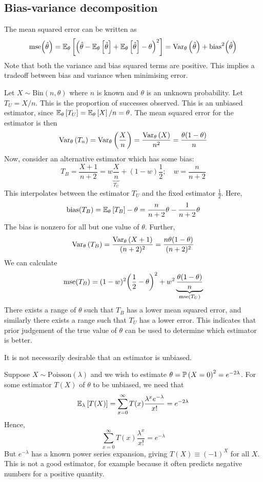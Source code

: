 \subsection{Bias-variance decomposition}
The mean squared error can be written as
\[
	\mathrm{mse}\qty(\hat \theta) = \mathbb{E}_{\theta}\left[{\qty(\hat \theta - \mathbb{E}_{\theta}\left[{\hat\theta}\right] + \mathbb{E}_{\theta}\left[{\hat\theta}\right] - \theta)^2}\right] = \operatorname{Var}_{\theta}\left({\hat \theta}\right) + \mathrm{bias}^2\qty(\hat\theta)
\]
Note that both the variance and bias squared terms are positive.
This implies a tradeoff between bias and variance when minimising error.
\begin{example}
	Let \( X \sim \mathrm{Bin}(n, \theta) \) where \( n \) is known and \( \theta \) is an unknown probability.
	Let \( T_U = X / n \).
	This is the proportion of successes observed.
	This is an unbiased estimator, since \( \mathbb{E}_{\theta}\left[{T_U}\right] = \mathbb{E}_{\theta}\left[{X}\right]/n = \theta \).
	The mean squared error for the estimator is then
	\[
		\operatorname{Var}_{\theta}\left({T_n}\right) = \operatorname{Var}_{\theta}\left({\frac{X}{n}}\right) = \frac{\operatorname{Var}_{\theta}\left({X}\right)}{n^2} = \frac{\theta(1-\theta)}{n}
	\]
	Now, consider an alternative estimator which has some bias:
	\[
		T_B = \frac{X+1}{n+2} = w \underbrace{\frac{X}{n}}_{T_U} + (1-w)\frac{1}{2};\quad w = \frac{n}{n+2}
	\]
	This interpolates between the estimator \( T_U \) and the fixed estimator \( \frac{1}{2} \).
	Here,
	\[
		\mathrm{bias}(T_B) = \mathbb{E}_{\theta}\left[{T_B}\right] - \theta = \frac{n}{n+2}\theta - \frac{1}{n+2}\theta
	\]
	The bias is nonzero for all but one value of \( \theta \).
	Further,
	\[
		\operatorname{Var}_{\theta}\left({T_B}\right) = \frac{\operatorname{Var}_{\theta}\left({X+1}\right)}{(n+2)^2} = \frac{n\theta(1-\theta)}{(n+2)^2}
	\]
	We can calculate
	\[
		\mathrm{mse}(T_B) = (1-w)^2 \qty(\frac{1}{2} - \theta)^2 + w^2\underbrace{\frac{\theta(1-\theta)}{n}}_{\mathrm{mse}(T_U)}
	\]
	There exists a range of \( \theta \) such that \( T_B \) has a lower mean squared error, and similarly there exists a range such that \( T_U \) has a lower error.
	This indicates that prior judgement of the true value of \( \theta \) can be used to determine which estimator is better.
\end{example}
It is not necessarily desirable that an estimator is unbiased.
\begin{example}
	Suppose \( X \sim \mathrm{Poisson}(\lambda) \) and we wish to estimate \( \theta = \mathbb{P}\left({X = 0}\right)^2 = e^{-2\lambda} \).
	For some estimator \( T(X) \) of \( \theta \) to be unbiased, we need that
	\[
		\mathbb{E}_{\lambda}\left[{T(X)}\right] = \sum_{x=0}^\infty T(x) \frac{\lambda^x e^{-\lambda}}{x!} = e^{-2\lambda}
	\]
	Hence,
	\[
		\sum_{x=0}^\infty T(x) \frac{\lambda^x}{x!} = e^{-\lambda}
	\]
	But \( e^{-\lambda} \) has a known power series expansion, giving \( T(X) \equiv (-1)^X \) for all \( X \).
	This is not a good estimator, for example because it often predicts negative numbers for a positive quantity.
\end{example}

